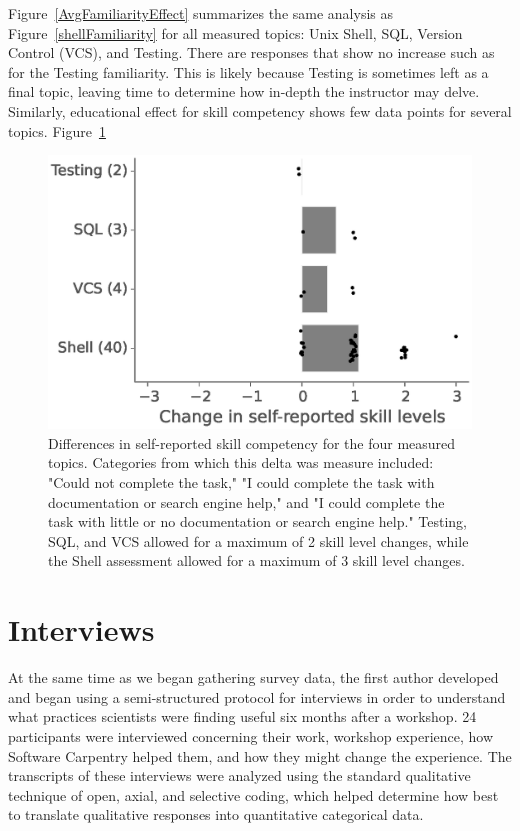 \documentclass[10pt, twocolumn]{article}
\begin{document}
Figure~\ref{AvgFamiliarityEffect} summarizes the same analysis as Figure~\ref{shellFamiliarity}
for all measured topics: Unix Shell, SQL, Version Control (VCS), and Testing.
There are responses that show no increase such as for the Testing familiarity.
This is likely because Testing is sometimes left as a final topic,
leaving time to determine how in-depth the instructor may delve. 
Similarly, educational effect for skill competency
shows few data points for several topics. Figure~\ref{AvgSkillEffect}

\begin{figure}
\centering
\includegraphics[width=\linewidth]{AvgSkillEffect}
\caption{
    Differences in self-reported skill competency for the four measured topics. Categories from which this delta was measure included: "Could not complete the task," "I could complete the task with documentation or search engine help," and "I could complete the task with little or no documentation or search engine help." Testing, SQL, and VCS allowed for a maximum of 2 skill level changes, while the Shell assessment allowed for a maximum of 3 skill level changes.
\label{AvgSkillEffect}}

\end{figure}

\section{Interviews}

At the same time as we began gathering survey data,
the first author developed and began using a semi-structured protocol for interviews
in order to understand what practices scientists were finding useful six months after a workshop.
24 participants were interviewed concerning their work,
workshop experience,
how Software Carpentry helped them,
and how they might change the experience.
The transcripts of these interviews were analyzed
using the standard qualitative technique of open, axial, and selective coding,
which helped determine how best to translate qualitative responses into quantitative categorical data.
\end{document}
